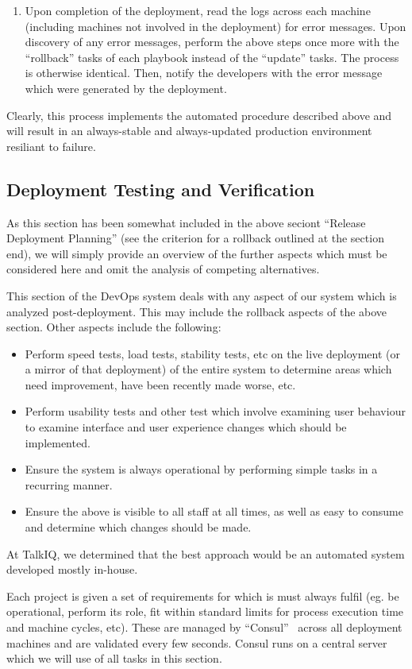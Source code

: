 \documentclass[12pt]{article}
\begin{document}
\begin{enumerate}
\item Upon completion of the deployment, read the logs across each machine (including machines not involved in the deployment) for error messages. Upon discovery of any error messages, perform the above steps once more with the ``rollback'' tasks of each playbook instead of the ``update'' tasks. The process is otherwise identical. Then, notify the developers with the error message which were generated by the deployment.
\end{enumerate}

Clearly, this process implements the automated procedure described above and will result in an always-stable and always-updated production environment resiliant to failure.

\subsection{Deployment Testing and Verification}
As this section has been somewhat included in the above seciont ``Release Deployment Planning'' (see the criterion for a rollback outlined at the section end), we will simply provide an overview of the further aspects which must be considered here and omit the analysis of competing alternatives.

This section of the DevOps system deals with any aspect of our system which is analyzed post-deployment. This may include the rollback aspects of the above section. Other aspects include the following:
\begin{itemize}
\item Perform speed tests, load tests, stability tests, etc on the live deployment (or a mirror of that deployment) of the entire system to determine areas which need improvement, have been recently made worse, etc.
\item Perform usability tests and other test which involve examining user behaviour to examine interface and user experience changes which should be implemented.
\item Ensure the system is always operational by performing simple tasks in a recurring manner.
\item Ensure the above is visible to all staff at all times, as well as easy to consume and determine which changes should be made.
\end{itemize}

At TalkIQ, we determined that the best approach would be an automated system developed mostly in-house.

Each project is given a set of requirements for which is must always fulfil (eg. be operational, perform its role, fit within standard limits for process execution time and machine cycles, etc). These are managed by ``Consul''~\cite{consul} across all deployment machines and are validated every few seconds. Consul runs on a central server which we will use of all tasks in this section.
\end{document}

